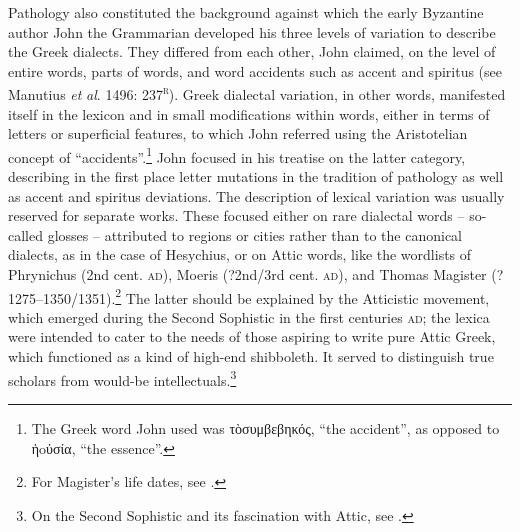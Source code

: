 Pathology also constituted the background against which the early Byzantine author John the Grammarian developed his three levels of variation to describe the Greek dialects. They differed from each other, John claimed, on the level of entire words, parts of words, and word accidents such as accent and spiritus (see Manutius \textit{et} \textit{al}. 1496: 237\textsc{\textsuperscript{r}}). Greek dialectal variation, in other words, manifested itself in the lexicon and in small modifications within words, either in terms of letters or superficial features, to which John referred using the Aristotelian concept of “accidents”.\footnote{The Greek word John used was τὸσυμβεβηκός, “the accident”, as opposed to ἡoὐσία, “the essence”.} John focused in his treatise on the latter category, describing in the first place letter mutations in the tradition of pathology as well as accent and spiritus deviations. The description of lexical variation was usually reserved for separate works. These focused either on rare dialectal words – so-called glosses – attributed to regions or cities rather than to the canonical dialects, as in the case of Hesychius, or on Attic words, like the wordlists of Phrynichus (2nd cent. \textsc{ad}), Moeris (?2nd/3rd cent. \textsc{ad}), and Thomas Magister (?1275–1350/1351).\footnote{ \textrm{For Magister’s life dates, see \citet[417]{Baloglou1998}.}} The latter should be explained by the Atticistic movement, which emerged during the Second Sophistic in the first centuries \textsc{ad}; the lexica were intended to cater to the needs of those aspiring to write pure Attic Greek, which functioned as a kind of high-end shibboleth. It served to distinguish true scholars from would-be intellectuals.\footnote{On the Second Sophistic and its fascination with Attic, see \citet{Whitmarsh2005}.}



